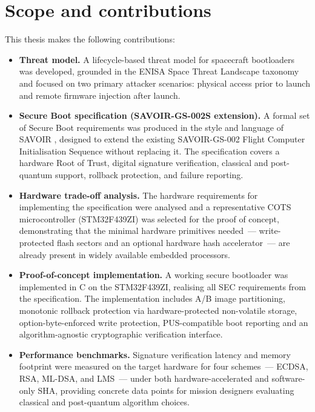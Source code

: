 \section{Scope and contributions}
\label{section:intro-scope}

This thesis makes the following contributions:

\begin{itemize}
    \item \textbf{Threat model.} A lifecycle-based threat model for spacecraft bootloaders was developed, grounded in the ENISA Space Threat Landscape taxonomy \cite{enisa_2025} and focused on two primary attacker scenarios: physical access prior to launch and remote firmware injection after launch.

    \item \textbf{Secure Boot specification (SAVOIR-GS-002S extension).} A formal set of Secure Boot requirements was produced in the style and language of SAVOIR \cite{SAVOIR}, designed to extend the existing SAVOIR-GS-002 Flight Computer Initialisation Sequence without replacing it. The specification covers a hardware Root of Trust, digital signature verification, classical and post-quantum support, rollback protection, and failure reporting.

    \item \textbf{Hardware trade-off analysis.} The hardware requirements for implementing the specification were analysed and a representative COTS microcontroller (STM32F439ZI) was selected for the proof of concept, demonstrating that the minimal hardware primitives needed~--- write-protected flash sectors and an optional hardware hash accelerator~--- are already present in widely available embedded processors.

    \item \textbf{Proof-of-concept implementation.} A working secure bootloader was implemented in C on the STM32F439ZI, realising all SEC requirements from the specification. The implementation includes A/B image partitioning, monotonic rollback protection via hardware-protected non-volatile storage, option-byte-enforced write protection, PUS-compatible boot reporting and an algorithm-agnostic cryptographic verification interface.

    \item \textbf{Performance benchmarks.} Signature verification latency and memory footprint were measured on the target hardware for four schemes~--- ECDSA, RSA, ML-DSA, and LMS~--- under both hardware-accelerated and software-only SHA, providing concrete data points for mission designers evaluating classical and post-quantum algorithm choices.
\end{itemize}


